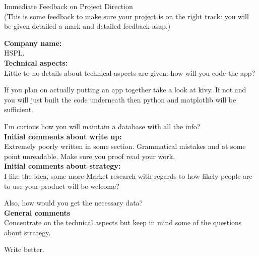 \documentclass{article}
\begin{document}
\begin{center}
\Huge{Immediate Feedback on Project Direction}\\
\tiny{(This is some feedback to make sure your project is on the right track: you will be given detailed a mark and detailed feedback asap.)}
\end{center}


\normalsize
\textbf{Company name:}\\

HSPL. \\

\textbf{Technical aspects:}\\

Little to no details about technical aspects are given: how will you code the app?

If you plan on actually putting an app together take a look at kivy.
If not and you will just built the code underneath then python and matplotlib will be sufficient.

I'm curious how you will maintain a database with all the info?\\

\textbf{Initial comments about write up:}\\

Extremely poorly written in some section. Grammatical mistakes and at some point unreadable. Make sure you proof read your work.\\

\textbf{Initial comments about strategy:}\\

I like the idea, some more Market research with regards to how likely people are to use your product will be welcome?

Also, how would you get the necessary data?\\

\textbf{General comments}\\

Concentrate on the technical aspects but keep in mind some of the questions about strategy.

Write better.
\end{document}
